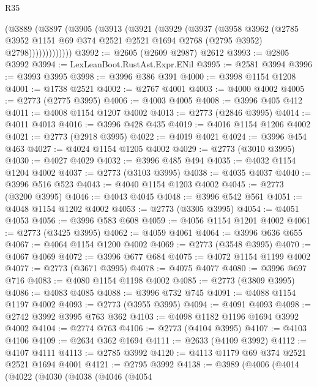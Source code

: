 \begin{lexlean}{R35}
\begin{coremodule}
            (@3889
              (@3897
                (@3905
                  (@3913
                    (@3921
                      (@3929
                        (@3937
                          (@3958
                            @3962
                            (@2785
                              @3952
                              @1151
                              @69
                              @374
                              @2521
                              @2521
                              @1694
                              @2768
                              (@2795 @3952)
                              @2798)))))))))))))
@3992 := @2605 (@2609 @2987) @2612
@3993 := @2805 @3992
@3994 := LexLeanBoot.RustAst.Expr.ENil
@3995 := @2581 @3994
@3996 := @3993 @3995
@3998 := @3996 @386 @391
@4000 := @3998 @1154 @1208
@4001 := @1738 @2521
@4002 := @2767 @4001
@4003 := @4000 @4002
@4005 := @2773 (@2775 @3995)
@4006 := @4003 @4005
@4008 := @3996 @405 @412
@4011 := @4008 @1154 @1207 @4002
@4013 := @2773 (@2846 @3995)
@4014 := @4011 @4013
@4016 := @3996 @428 @435
@4019 := @4016 @1154 @1206 @4002
@4021 := @2773 (@2918 @3995)
@4022 := @4019 @4021
@4024 := @3996 @454 @463
@4027 := @4024 @1154 @1205 @4002
@4029 := @2773 (@3010 @3995)
@4030 := @4027 @4029
@4032 := @3996 @485 @494
@4035 := @4032 @1154 @1204 @4002
@4037 := @2773 (@3103 @3995)
@4038 := @4035 @4037
@4040 := @3996 @516 @523
@4043 := @4040 @1154 @1203 @4002
@4045 := @2773 (@3200 @3995)
@4046 := @4043 @4045
@4048 := @3996 @542 @561
@4051 := @4048 @1154 @1202 @4002
@4053 := @2773 (@3305 @3995)
@4054 := @4051 @4053
@4056 := @3996 @583 @608
@4059 := @4056 @1154 @1201 @4002
@4061 := @2773 (@3425 @3995)
@4062 := @4059 @4061
@4064 := @3996 @636 @655
@4067 := @4064 @1154 @1200 @4002
@4069 := @2773 (@3548 @3995)
@4070 := @4067 @4069
@4072 := @3996 @677 @684
@4075 := @4072 @1154 @1199 @4002
@4077 := @2773 (@3671 @3995)
@4078 := @4075 @4077
@4080 := @3996 @697 @716
@4083 := @4080 @1154 @1198 @4002
@4085 := @2773 (@3809 @3995)
@4086 := @4083 @4085
@4088 := @3996 @732 @745
@4091 := @4088 @1154 @1197 @4002
@4093 := @2773 (@3955 @3995)
@4094 := @4091 @4093
@4098 := @2742 @3992 @3995 @763 @362
@4103 := @4098 @1182 @1196 @1694 @3992 @4002
@4104 := @2774 @763
@4106 := @2773 (@4104 @3995)
@4107 := @4103 @4106
@4109 := @2634 @362 @1694
@4111 := @2633 (@4109 @3992)
@4112 := @4107 @4111
@4113 := @2785 @3992
@4120 := @4113 @1179 @69 @374 @2521 @2521 @1694 @4001
@4121 := @2795 @3992
@4138 := @3989
    (@4006
      (@4014
        (@4022
          (@4030
            (@4038
              (@4046
                (@4054

\end{coremodule}
\end{lexlean}
